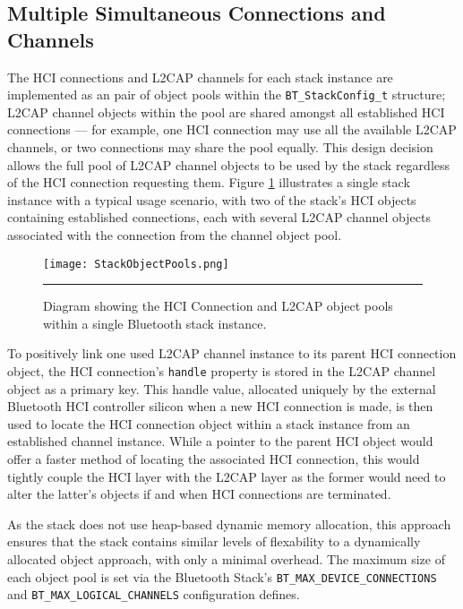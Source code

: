

\FloatBarrier
\subsection{Multiple Simultaneous Connections and Channels}

The HCI connections and L2CAP channels for each stack instance are implemented as an pair of object pools within the \lstinline{BT_StackConfig_t} structure; L2CAP channel objects within the pool are shared amongst all established HCI connections --- for example, one HCI connection may use all the available L2CAP channels, or two connections may share the pool equally. This design decision allows the full pool of L2CAP channel objects to be used by the stack regardless of the HCI connection requesting them. Figure \ref{fig:stackobjectpools} illustrates a single stack instance with a typical usage scenario, with two of the stack's HCI objects containing established connections, each with several L2CAP channel objects associated with the connection from the channel object pool.

\begin{figure}[tbph]
	\vspace{1em}
	\centering
		\texttt{[image: StackObjectPools.png]}
	\rule{35em}{0.5pt}
	\caption[Diagram of the Bluetooth stack instance object pools]{Diagram showing the HCI Connection and L2CAP object pools within a single Bluetooth stack instance.}
	\label{fig:stackobjectpools}
\end{figure}

To positively link one used L2CAP channel instance to its parent HCI connection object, the HCI connection's \lstinline{handle} property is stored in the L2CAP channel object as a primary key. This handle value, allocated uniquely by the external Bluetooth HCI controller silicon when a new HCI connection is made, is then used to locate the HCI connection object within a stack instance from an established channel instance. While a pointer to the parent HCI object would offer a faster method of locating the associated HCI connection, this would tightly couple the HCI layer with the L2CAP layer as the former would need to alter the latter's objects if and when HCI connections are terminated.

As the stack does not use heap-based dynamic memory allocation, this approach ensures that the stack contains similar levels of flexability to a dynamically allocated object approach, with only a minimal overhead. The maximum size of each object pool is set via the Bluetooth Stack's \lstinline{BT_MAX_DEVICE_CONNECTIONS} and \lstinline{BT_MAX_LOGICAL_CHANNELS} configuration defines.

